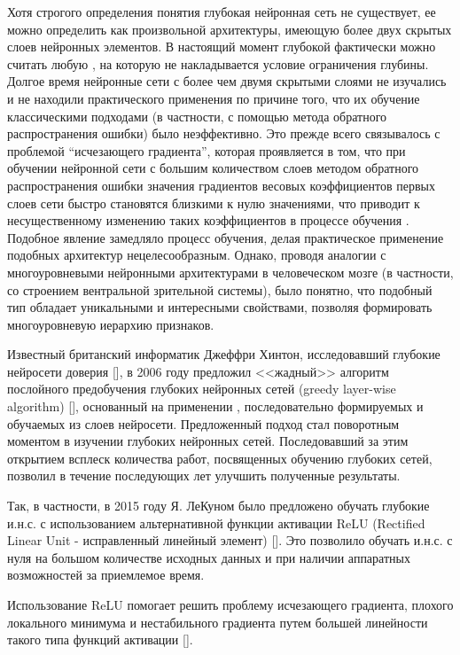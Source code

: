 Хотя строгого определения понятия глубокая нейронная сеть не существует, ее можно определить как  произвольной архитектуры, имеющую более двух скрытых слоев нейронных элементов. В настоящий момент глубокой фактически можно считать любую , на которую не накладывается условие ограничения глубины. Долгое время нейронные сети с более чем двумя скрытыми слоями не изучались и не находили практического применения по причине того, что их обучение классическими подходами (в частности, с помощью метода обратного распространения ошибки) было неэффективно. Это прежде всего связывалось с проблемой ``исчезающего градиента'', которая проявляется в том, что при обучении нейронной сети с большим количеством слоев методом обратного распространения ошибки значения градиентов весовых коэффициентов первых слоев сети быстро становятся близкими к нулю значениями, что приводит к несущественному изменению таких коэффициентов в процессе обучения \cite{n5}. Подобное явление замедляло процесс обучения, делая практическое применение подобных архитектур нецелесообразным. Однако, проводя аналогии с многоуровневыми нейронными архитектурами в человеческом мозге (в частности, со строением вентральной зрительной системы), было понятно, что подобный тип  обладает  уникальными и интересными свойствами, позволяя формировать многоуровневую иерархию признаков.

Известный британский информатик Джеффри Хинтон, исследовавший глубокие нейросети доверия [\scncite{}], в 2006 году предложил <<жадный>> алгоритм послойного предобучения глубоких нейронных сетей (greedy layer-wise algorithm) [], основанный на применении , последовательно формируемых и обучаемых из слоев нейросети. Предложенный подход стал поворотным моментом в изучении глубоких нейронных сетей. Последовавший за этим открытием всплеск количества работ, посвященных обучению глубоких сетей, позволил в течение последующих лет улучшить полученные результаты. 

Так, в частности, в 2015 году Я. ЛеКуном было предложено обучать глубокие и.н.с. с использованием альтернативной функции активации ReLU (Rectified Linear Unit - исправленный линейный элемент) [].  Это позволило обучать и.н.с. с нуля на большом количестве исходных данных и при наличии аппаратных возможностей за приемлемое время.

Использование ReLU помогает решить проблему исчезающего градиента, плохого локального минимума и нестабильного градиента путем большей линейности такого типа функций активации [\scncite{}].

